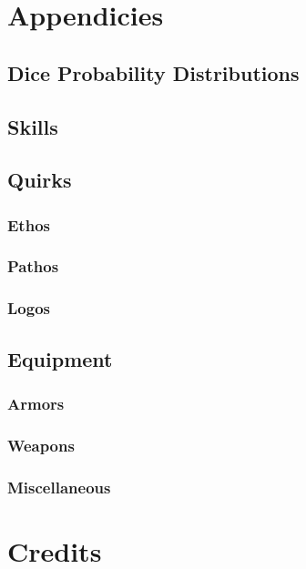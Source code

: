 \documentclass[oneside]{book}
\begin{document}
    \part{Appendicies}
    \begin{appendices}

        \chapter{Dice Probability Distributions}

        \chapter{Skills}

        \chapter{Quirks}
            \section{Ethos}
            \section{Pathos}
            \section{Logos}

        \chapter{Equipment}
            \section{Armors}
            \section{Weapons}
            \section{Miscellaneous}

    \end{appendices}

    \part{Credits}
    
\end{document}

